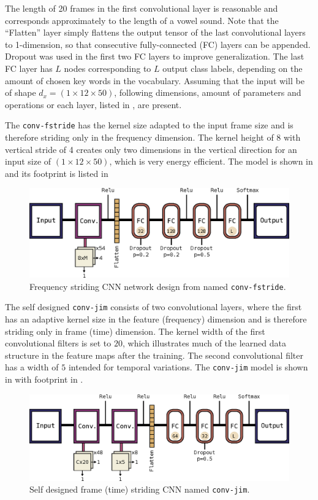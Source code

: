 The length of 20 frames in the first convolutional layer is reasonable and corresponds approximately to the length of a vowel sound.
Note that the \enquote{Flatten} layer simply flattens the output tensor of the last convolutional layers to 1-dimension, so that consecutive fully-connected (FC) layers can be appended.
Dropout was used in the first two FC layers to improve generalization.
The last FC layer has $L$ nodes corresponding to $L$ output class labels, depending on the amount of chosen key words in the vocabulary.
Assuming that the input will be of shape $d_x = (1 \times 12 \times 50)$, following dimensions, amount of parameters and operations or each layer, listed in , are present.


The \texttt{conv-fstride} has the kernel size adapted to the input frame size and is therefore striding only in the frequency dimension.
The kernel height of 8 with vertical stride of 4 creates only two dimensions in the vertical direction for an input size of $(1 \times 12 \times 50)$, which is very energy efficient.
The model is shown in  and its footprint is listed in 
\begin{figure}[!ht]
  \centering
    \includegraphics[height=0.2\textwidth]{./4_nn/figs/nn_arch_cnn_fstride.eps}
  \caption{Frequency striding CNN network design from \cite{Sainath2015} named \texttt{conv-fstride}.}
  \label{fig:nn_arch_cnn_fstride}
\end{figure}
\FloatBarrier
\noindent


The self designed \texttt{conv-jim} consists of two convolutional layers, where the first has an adaptive kernel size in the feature (frequency) dimension and is therefore striding only in frame (time) dimension.
The kernel width of the first convolutional filters is set to $20$, which illustrates much of the learned data structure in the feature maps after the training.
The second convolutional filter has a width of $5$ intended for temporal variations.
The \texttt{conv-jim} model is shown in  with footprint in .
\begin{figure}[!ht]
  \centering
    \includegraphics[height=0.2\textwidth]{./4_nn/figs/nn_arch_cnn_conv-jim.eps}
  \caption{Self designed frame (time) striding CNN named \texttt{conv-jim}.}
  \label{fig:nn_arch_cnn_conv-jim}
\end{figure}
\FloatBarrier
\noindent


